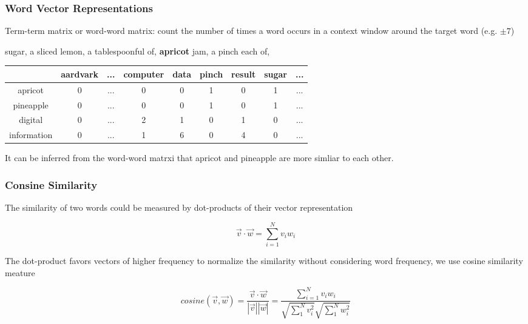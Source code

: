 \documentclass[notheorems, aspectratio=54]{beamer}
\begin{document}
\begin{frame}

\frametitle{Word Vector Representations}
Term-term matrix or word-word matrix: count the number of times a word occurs in a context window around the target word (e.g. $\pm 7$)

sugar, a sliced lemon, a tablespoonful of, {\bfseries apricot} jam, a pinch each of,

\begin{center}
 \begin{tabular}{c c c c c c c c c} 
 \hline
   & aardvark &...& computer & data & pinch & result & sugar & ...\\ [0.5ex] 
 \hline\hline
 apricot & 0 &...& 0 & 0 & 1 & 0 & 1 & ...\\ 
 \hline
 pineapple & 0 &...& 0 & 0 & 1 & 0 & 1 & ...\\
 \hline
 digital  & 0 &...& 2 & 1 & 0 & 1 & 0 & ...\\
 \hline
 information  & 0 &...& 1 & 6 & 0 & 4 & 0 & ... \\
 \hline
\end{tabular}
\end{center}

It can be inferred from the word-word matrxi that apricot and pineapple are more simliar to each other. 

\end{frame}




\begin{frame}
\frametitle{Consine Similarity}

The similarity of two words could be measured by dot-products of their vector representation

$$
\vec{v}\cdot\vec{w}=\sum_{i=1}^N v_i w_i
$$

The dot-product favors vectors of higher frequency to normalize the similarity without considering word frequency, we use cosine similarity meature 

$$
cosine(\vec{v}, \vec{w})=\frac{\vec{v}\cdot\vec{w}}{|\vec{v}||\vec{w}|}=\frac{\sum_{i=1}^N v_i w_i}{\sqrt{\sum_1^N v_i^2}\sqrt{\sum_1^N w_i^2}}
$$


\end{frame}
\end{document}
